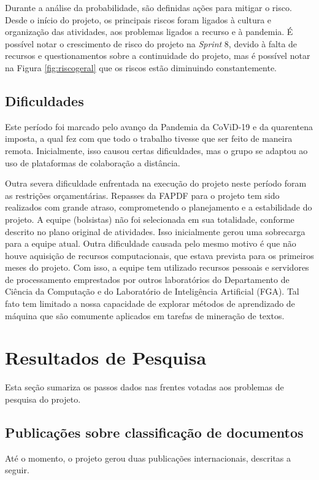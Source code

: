\documentclass[12pt]{article}
\begin{document}
Durante a análise da probabilidade, são definidas ações para mitigar o risco. Desde o início do projeto, os principais riscos foram ligados à cultura e organização das atividades, aos problemas ligados a recurso e à pandemia. É possível notar o crescimento de risco do projeto na {\em Sprint} 8, devido à falta de recursos e questionamentos sobre a continuidade do projeto, mas é possível notar na Figura \ref{fig:riscogeral} que os riscos estão diminuindo constantemente.


\subsection{Dificuldades}
\label{sec:difficulties}
Este período foi marcado pelo avanço da Pandemia da CoViD-19 e da quarentena imposta, a qual fez com que todo o trabalho tivesse que ser feito de maneira remota. Inicialmente, isso causou certas dificuldades, mas o grupo se adaptou ao uso de plataformas de colaboração a distância. 

Outra severa dificuldade enfrentada na execução do projeto neste período foram as restrições orçamentárias. Repasses da FAPDF para o projeto tem sido realizados com grande atraso, comprometendo o planejamento e a estabilidade do projeto. A equipe (bolsistas) não foi selecionada em sua totalidade, conforme descrito no plano original de atividades. Isso inicialmente gerou uma sobrecarga para a equipe atual. Outra dificuldade causada pelo mesmo motivo é que não houve aquisição de recursos computacionais, que estava prevista para os primeiros meses do projeto. Com isso, a equipe tem utilizado recursos pessoais e servidores de processamento emprestados por outros laboratórios do Departamento de Ciência da Computação e do Laboratório de Inteligência Artificial (FGA). Tal fato tem limitado a nossa capacidade de explorar métodos de aprendizado de máquina que são comumente aplicados em tarefas de mineração de textos.

\section{Resultados de Pesquisa}
\label{sec:resultados}
Esta seção sumariza os passos dados nas frentes votadas aos problemas de
pesquisa do projeto.

\subsection{Publicações sobre classificação de documentos}
\label{subsec:pub}
Até o momento, o projeto gerou duas publicações internacionais, descritas a seguir.
\end{document}
